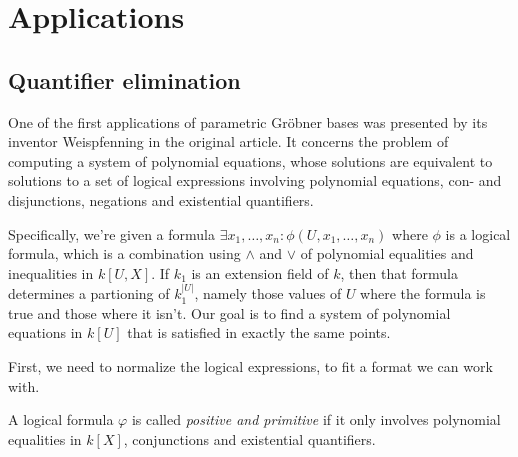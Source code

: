 \section{Applications}

\subsection{Quantifier elimination}
One of the first applications of parametric Gröbner bases was presented by its inventor Weispfenning \cite{Weispfenning} in the original article. It concerns the problem of computing a system of polynomial equations, whose solutions are equivalent to solutions to a set of logical expressions involving polynomial equations, con- and disjunctions, negations and existential quantifiers.

Specifically, we're given a formula $\exists x_{1}, \dots, x_{n} : \phi(U, x_{1}, \dots, x_{n})$ where $\phi$ is a logical formula, which is a combination using $\land$ and $\lor$ of polynomial equalities and inequalities in $k[U, X]$. If $k_{1}$ is an extension field of $k$, then that formula determines a partioning of $k_{1}^{|U|}$, namely those values of $U$ where the formula is true and those where it isn't. Our goal is to find a system of polynomial equations in $k[U]$ that is satisfied in exactly the same points.

First, we need to normalize the logical expressions, to fit a format we can work with.

\begin{definition}
  A logical formula $\varphi$ is called \textit{positive and primitive} if it only involves polynomial equalities in $k[X]$, conjunctions and existential quantifiers.
\end{definition}

